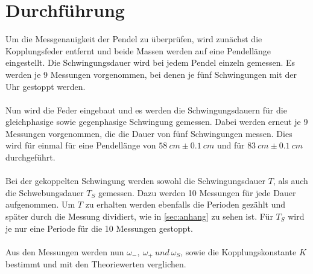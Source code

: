 \section{Durchführung}
\label{sec:Durchführung}

Um die Messgenauigkeit der Pendel zu überprüfen, wird zunächst die Kopplungsfeder entfernt und beide Massen werden auf eine Pendellänge eingestellt.
Die Schwingungsdauer wird bei jedem Pendel einzeln gemessen.
Es werden je 9 Messungen vorgenommen, bei denen je fünf Schwingungen mit der Uhr gestoppt werden.
\\
\ 
\\
Nun wird die Feder eingebaut und es werden die Schwingungsdauern für die gleichphasige sowie gegenphasige Schwingung gemessen.
Dabei werden erneut je 9 Messungen vorgenommen, die die Dauer von fünf Schwingungen messen.
Dies wird für einmal für eine Pendellänge von $58\ cm\pm0.1\ cm$ und für $83\ cm\pm0.1\ cm$ durchgeführt.
\\
\ 
\\
Bei der gekoppelten Schwingung werden sowohl die Schwingungsdauer $T$, als auch die Schwebungsdauer $T_S$ gemessen.
Dazu werden 10 Messungen für jede Dauer aufgenommen.
Um $T$ zu erhalten werden ebenfalls die Perioden gezählt und später durch die Messung dividiert, wie in \autoref{sec:anhang} zu sehen ist.
Für $T_S$ wird je nur eine Periode für die 10 Messungen gestoppt.
\\
\ 
\\
Aus den Messungen werden nun $\omega_-,\ \omega_+\ und\ \omega_S$, sowie die Kopplungskonstante $K$ bestimmt und mit den Theoriewerten verglichen.